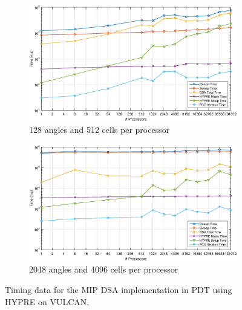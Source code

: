 \begin{figure}
\centering
{
	\begin{subfigure}[b]{\textwidth}
		\centering
		\includegraphics[width=\textwidth]{figures/sec_DSA/A128.eps}
		\caption{128 angles and 512 cells per processor}
	\end{subfigure}
}
	\vspace{1cm}
{
	\begin{subfigure}[b]{\textwidth}
		\centering
		\includegraphics[width=\textwidth]{figures/sec_DSA/A2048.eps}
		\caption{2048 angles and 4096 cells per processor}
	\end{subfigure}
}
\caption{Timing data for the MIP DSA implementation in PDT using HYPRE on VULCAN.}
\label{fig::DSA_Scaling_Timing}
\end{figure}

